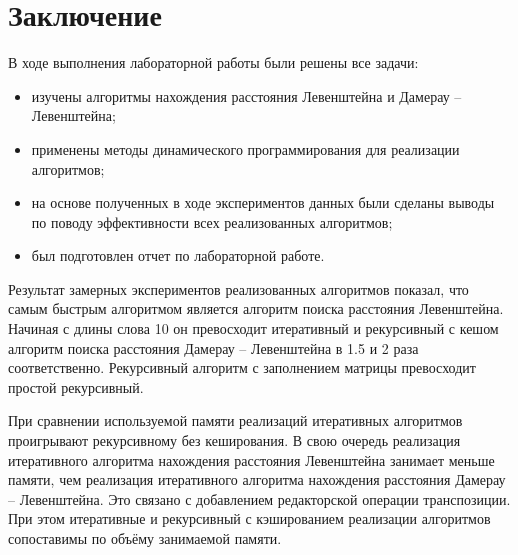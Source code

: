 \chapter*{Заключение}

В ходе выполнения лабораторной работы были решены все задачи:
\begin{itemize}
	\item изучены алгоритмы нахождения расстояния Левенштейна и Дамерау -- Левенштейна;
	\item применены методы динамического программирования для реализации алгоритмов;
	\item на основе полученных в ходе экспериментов данных были сделаны выводы по поводу эффективности всех реализованных алгоритмов;
	\item был подготовлен отчет по лабораторной работе.
\end{itemize}

Результат замерных экспериментов реализованных алгоритмов показал, что самым быстрым алгоритмом является алгоритм поиска расстояния Левенштейна. Начиная с длины слова 10 он превосходит итеративный и рекурсивный с кешом алгоритм поиска расстояния Дамерау -- Левенштейна в 1.5 и 2 раза соответственно. Рекурсивный алгоритм с заполнением матрицы превосходит простой рекурсивный.

При сравнении используемой памяти реализаций итеративных алгоритмов проигрывают рекурсивному без кеширования. В свою очередь реализация итеративного алгоритма нахождения расстояния Левенштейна занимает меньше памяти, чем  реализация итеративного алгоритма нахождения расстояния Дамерау -- Левенштейна. Это связано с добавлением редакторской операции транспозиции. При этом итеративные и рекурсивный с кэшированием реализации алгоритмов сопоставимы по объёму занимаемой памяти.
